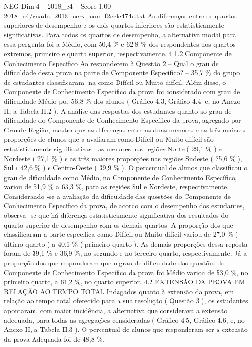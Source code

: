 \begin{textsample}{NEG Dim 4 – 2018\_c4 – Score 1.00 – 2018\_c4/enade\_2018\_serv\_soc\_f2ecfc474e.txt}
As diferenças entre os quartos superiores de desempenho e os dois quartos inferiores são estatisticamente significativas.
Para todos os quartos de desempenho, a alternativa modal para essa pergunta foi a Médio, com 50,4 \% e 62,8 \% dos respondentes nos quartos extremos, primeiro e quarto superior, respectivamente. 4.1.2 Componente de Conhecimento Específico Ao responderem à Questão 2 – Qual o grau de dificuldade desta prova na parte de Componente Específico? – 35,7 \% do grupo de estudantes classificaram -na como Difícil ou Muito difícil.
Além disso, o Componente de Conhecimento Específico da prova foi considerado com grau de dificuldade Médio por 56,8 \% dos alunos ( Gráfico 4.3, Gráfico 4.4, e, no Anexo II, a Tabela II.2 ).
A análise das respostas dos estudantes quanto ao grau de dificuldade do Componente de Conhecimento Específico da prova, agregado por Grande Região, mostra que as diferenças entre as duas menores e as três maiores proporções de alunos que a avaliaram como Difícil ou Muito difícil são estatisticamente significativas : as menores nas regiões Norte ( 29,1 \% ) e Nordeste ( 27,1 \% ) e as três maiores proporções nas regiões Sudeste ( 35,6 \% ), Sul ( 42,6 \% ) e Centro-Oeste ( 39,9 \% ).
O percentual de alunos que classificou o grau de dificuldade como Médio, no Componente de Conhecimento Específico, variou de 51,9 \% a 63,3 \%, para as regiões Sul e Nordeste, respectivamente.
Considerando -se a avaliação da dificuldade das questões do Componente de Conhecimento Específico da prova, de acordo com o desempenho dos estudantes, observa -se que há diferença estatisticamente significativa dos resultados do quarto superior de desempenho com os demais quartos.
A proporção dos que classificaram a parte específica como Difícil ou Muito difícil variou de 27,0 \% ( último quarto ) a 40,6 \% ( primeiro quarto ).
As demais proporções dessa reposta foram de 39,1 \% e 36,9 \%, no segundo e no terceiro quarto, respectivamente.
Já a proporção dos que responderam que o grau de dificuldade das questões do Componente de Conhecimento Específico da prova foi Médio variou de 53,0 \%, no primeiro quarto, a 61,2 \%, no quarto superior. 4.2 EXTENSÃO DA PROVA EM RELAÇÃO AO TEMPO TOTAL Indagados quanto à extensão da prova, em relação ao tempo total oferecido para a sua resolução ( Questão 3 ), os estudantes apontaram, com maior incidência, a alternativa que considerava a extensão adequada, para todas as agregações consideradas ( Gráfico 4.5, Gráfico 4.6, e, no Anexo II, a Tabela II.3 ).
O percentual de alunos que responderam ser a extensão da prova Adequada foi de 48,8 \%.

\end{textsample}
